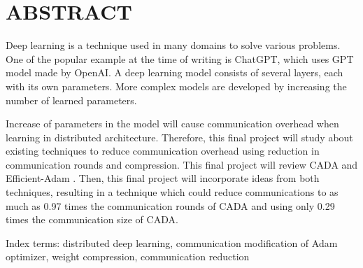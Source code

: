 \clearpage
\chapter*{ABSTRACT}
Deep learning is a technique used in many domains to solve various problems. One of the popular example at the time of writing is ChatGPT, which uses GPT model made by OpenAI. A deep learning model consists of several layers, each with its own parameters. More complex models are developed by increasing the number of learned parameters.

Increase of parameters in the model will cause communication overhead when learning in distributed architecture. Therefore, this final project will study about existing techniques to reduce communication overhead using reduction in communication rounds and compression. This final project will review CADA \parencite{Chen2021CADA} and Efficient-Adam \parencite{Chen2022Efficient}. Then, this final project will incorporate ideas from both techniques, resulting in a technique which could reduce communications to as much as 0.97 times the communication rounds of CADA and using only 0.29 times the communication size of CADA.

Index terms: distributed deep learning, communication modification of Adam optimizer, weight compression, communication reduction

\clearpage
